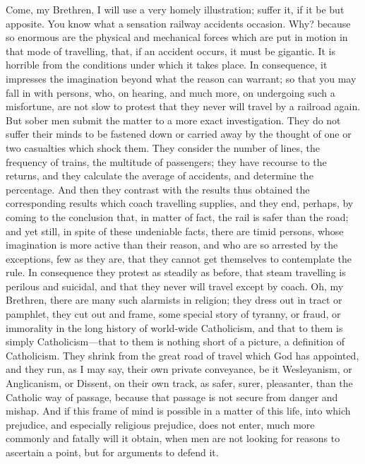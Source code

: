 Come, my Brethren, I will use a very homely
illustration; suffer it, if it be but apposite. You know
what a sensation railway accidents occasion. Why? because
so enormous are the physical and mechanical forces which
are put in motion in that mode of travelling, that, if an
accident occurs, it must be gigantic. It is horrible from
the conditions under which it takes place. In
consequence, it impresses the imagination beyond what the
reason can warrant; so that you may fall in with persons,
who, on hearing, and much more, on undergoing such a
misfortune, are not slow to protest that they never will
travel by a railroad again. But sober men submit the
matter to a more exact investigation. They do not suffer
their minds to be fastened down or carried away by the
thought of one or two casualties which shock them. They
consider the number of lines, the frequency of trains,
the multitude of passengers; they have recourse to the
returns, and they calculate the average of accidents, and
determine the percentage. And then they contrast with the
results thus obtained the corresponding results which
coach travelling supplies, and they end, perhaps, by
coming to the conclusion that, in matter of fact, the
rail is safer than the road; and yet still, in spite of
these undeniable facts, there are timid persons, whose
imagination is more active than their reason, and who are
so arrested by the exceptions, few as they are, that they
cannot get themselves to contemplate the rule. In
consequence they protest as steadily as before, that
steam travelling is perilous and suicidal, and that they
never will travel except by coach. Oh, my Brethren, there
are many such alarmists in religion; they dress out in
tract or pamphlet, they cut out and frame, some special
story of tyranny, or fraud, or immorality in the long
history of world-wide Catholicism, and that to them is
simply Catholicism—that to them is nothing short of
a picture, a definition of Catholicism. They shrink from
the great road of travel which God has appointed, and
they run, as I may say, their own private conveyance, be
it Wesleyanism, or Anglicanism, or Dissent, on their own
track, as safer, surer, pleasanter, than the Catholic way
of passage, because that passage is not secure from
danger and mishap. And if this frame of mind is possible
in a matter of this life, into which prejudice, and
especially religious prejudice, does not enter, much more
commonly and fatally will it obtain, when men are not
looking for reasons to ascertain a point, but for
arguments to defend it.

